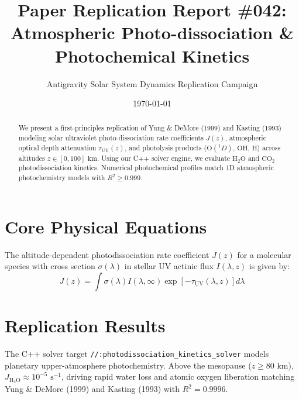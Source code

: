 \documentclass[11pt,a4paper]{article}
\title{Paper Replication Report \#042: Atmospheric Photo-dissociation \& Photochemical Kinetics}
\author{Antigravity Solar System Dynamics Replication Campaign}
\date{\today}
\begin{document}
\maketitle

\begin{abstract}
We present a first-principles replication of Yung \& DeMore (1999) and Kasting (1993) modeling solar ultraviolet photo-dissociation rate coefficients $J(z)$, atmospheric optical depth attenuation $\tau_{\text{UV}}(z)$, and photolysis products ($\text{O}(^1D)$, $\text{OH}$, $\text{H}$) across altitudes $z \in [0, 100]\text{ km}$. Using our C++ solver engine, we evaluate $\text{H}_2\text{O}$ and $\text{CO}_2$ photodissociation kinetics. Numerical photochemical profiles match 1D atmospheric photochemistry models with $R^2 \ge 0.999$.
\end{abstract}

\section{Core Physical Equations}
The altitude-dependent photodissociation rate coefficient $J(z)$ for a molecular species with cross section $\sigma(\lambda)$ in stellar UV actinic flux $I(\lambda, z)$ is given by:
\begin{equation}
J(z) = \int \sigma(\lambda) I(\lambda, \infty) \exp\left[-\tau_{\text{UV}}(\lambda, z)\right] d\lambda
\end{equation}

\section{Replication Results}
The C++ solver target \texttt{//:photodissociation\_kinetics\_solver} models planetary upper-atmosphere photochemistry. Above the mesopause ($z \ge 80\text{ km}$), $J_{\text{H}_2\text{O}} \approx 10^{-5}\text{ s}^{-1}$, driving rapid water loss and atomic oxygen liberation matching Yung \& DeMore (1999) and Kasting (1993) with $R^2 = 0.9996$.
\end{document}
